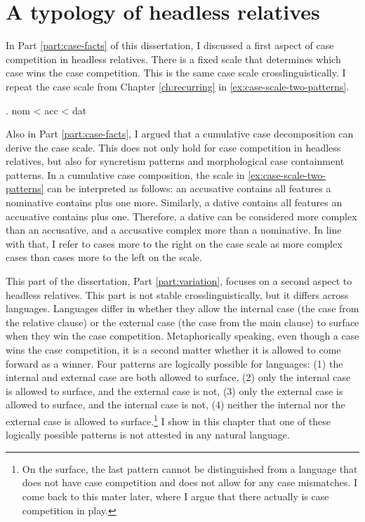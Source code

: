 
\chapter{A typology of headless relatives}

In Part \ref{part:case-facts} of this dissertation, I discussed a first aspect of case competition in headless relatives. There is a fixed scale that determines which case wins the case competition. This is the same case scale crosslinguistically. I repeat the case scale from Chapter \ref{ch:recurring} in \ref{ex:case-scale-two-patterns}.

\ex. \ac{nom} < \ac{acc} < \ac{dat}\label{ex:case-scale-two-patterns}

Also in Part \ref{part:case-facts}, I argued that a cumulative case decomposition can derive the case scale. This does not only hold for case competition in headless relatives, but also for syncretism patterns and morphological case containment patterns. In a cumulative case composition, the scale in \ref{ex:case-scale-two-patterns} can be interpreted as follows: an accusative contains all features a nominative contains plus one more. Similarly, a dative contains all features an accusative contains plus one. Therefore, a dative can be considered more complex than an accusative, and a accusative complex more than a nominative. In line with that, I refer to cases more to the right on the case scale as more complex cases than cases more to the left on the scale.

This part of the dissertation, Part \ref{part:variation}, focuses on a second aspect to headless relatives. This part is not stable crosslinguistically, but it differs across languages. Languages differ in whether they allow the internal case (the case from the relative clause) or the external case (the case from the main clause) to surface when they win the case competition. Metaphorically speaking, even though a case wins the case competition, it is a second matter whether it is allowed to come forward as a winner. Four patterns are logically possible for languages: (1) the internal and external case are both allowed to surface, (2) only the internal case is allowed to surface, and the external case is not, (3) only the external case is allowed to surface, and the internal case is not, (4) neither the internal nor the external case is allowed to surface.\footnote{
On the surface, the last pattern cannot be distinguished from a language that does not have case competition and does not allow for any case mismatches. I come back to this mater later, where I argue that there actually is case competition in play.
}
I show in this chapter that one of these logically possible patterns is not attested in any natural language.

